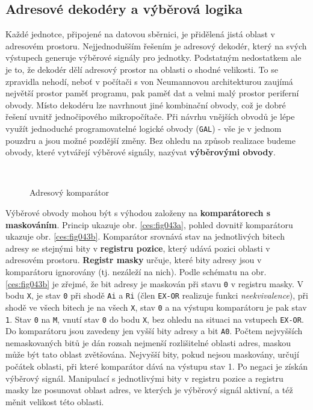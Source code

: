     \subsection{Adresové dekodéry a výběrová logika}
      Každé jednotce, připojené na datovou sběrnici, je přidělená jistá oblast v adresovém 
      prostoru. Nejjednodušším řešením je adresový dekodér, který na svých výstupech generuje 
      výběrové signály pro jednotky. Podstatným nedostatkem ale je to, že dekodér dělí adresový 
      prostor na oblasti o shodné velikosti. To se zpravidla nehodí, neboť v počítači s von 
      Neumannovou architekturou zaujímá největší prostor paměť programu, pak paměť dat a velmi malý 
      prostor periferní obvody. Místo dekodéru lze navrhnout jiné kombinační obvody, což je dobré 
      řešení uvnitř jednočipového mikropočítače. Při návrhu vnějších obvodů je lépe využít 
      jednoduché programovatelné logické obvody (\texttt{GAL}) - vše je v jednom pouzdru a jsou 
      možné pozdější změny. Bez ohledu na způsob realizace budeme obvody, které vytvářejí výběrové 
      signály, nazývat \textbf{výběrovými obvody}.
      
      \begin{figure}[ht!]
        \centering  
          {}              \\
          {}              
        \caption{Adresový komparátor}\label{ces:fig043}
      \end{figure}
      
      Výběrové obvody mohou být s výhodou založeny na \textbf{komparátorech s maskováním}. Princip 
      ukazuje obr. \ref{ces:fig043a}, pohled dovnitř komparátoru ukazuje obr. 
      \ref{ces:fig043b}. Komparátor srovnává stav na jednotlivých bitech adresy se stejnými 
      bity v \textbf{registru pozice}, který udává pozici oblasti v adresovém prostoru. 
      \textbf{Registr masky} určuje, které bity adresy jsou v komparátoru ignorovány (tj. nezáleží 
      na nich). Podle schématu na obr. \ref{ces:fig043b} je zřejmé, že bit adresy je 
      maskován při stavu \texttt{0} v registru masky. V bodu \texttt{X}, je stav \texttt{0} při 
      shodě \texttt{Ai} a \texttt{Ri} (člen \texttt{EX-OR} realizuje funkci   
      \emph{neekvivalence}), při shodě ve všech bitech je na všech \texttt{X}, stav \texttt{0} a na 
      výstupu komparátoru je pak stav \texttt{1}. Stav \texttt{0} na \texttt{M}, vnutí stav 
      \texttt{0} do bodu \texttt{X}, bez ohledu na situaci na vstupech \texttt{EX-OR}. Do 
      komparátoru jsou zavedeny jen vyšší bity adresy a bit \texttt{A0}. Počtem nejvyšších 
      nemaskovaných bitů je dán rozsah nejmenší rozlišitelné oblasti adres, maskou může být tato 
      oblast zvětšována. Nejvyšší bity, pokud nejsou maskovány, určují počátek oblasti, při které 
      komparátor dává na výstupu stav 1. Po negaci je získán výběrový signál. Manipulací s 
      jednotlivými bity v registru pozice a registru masky lze posunovat oblast adres, ve 
      kterých je výběrový signál aktivní, a též měnit velikost této oblasti.
      
